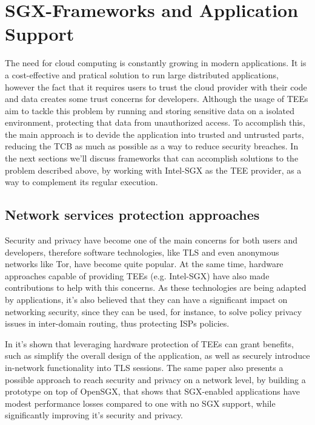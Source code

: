 \section{SGX-Frameworks and Application Support} %
\label{sec:sgx_frameworks}


The need for cloud computing is constantly growing in modern applications. It is a cost-effective and pratical solution to run large distributed applications, however the fact that it requires users to trust the cloud provider with their code and data creates some trust concerns for developers.
Although the usage of TEEs aim to tackle this problem by running and storing sensitive data on a isolated environment, protecting that data from unauthorized access. To accomplish this, the main approach is to devide the application into trusted and untrusted parts, reducing the TCB as much as possible as a way to reduce security breaches. 
In the next sections we'll discuss frameworks that can accomplish solutions to the problem described above, by working with Intel-SGX as the TEE provider, as a way to complement its regular execution.



\subsection{Network services protection approaches}
\label{ssec:sgx_network_frameworks}

Security and privacy have become one of the main concerns for both users and developers, therefore software technologies, like TLS and even anonymous networks like Tor, have become quite popular. At the same time, hardware approaches capable of providing TEEs (e.g. Intel-SGX) have also made contributions to help with this concerns. 
As these technologies are being adapted by applications, it's also believed that they can have a significant impact on networking security, since they can be used, for instance, to solve policy privacy issues in inter-domain routing, thus protecting ISPs policies. 

In \cite{torSGXPaper} it's shown that leveraging hardware protection of TEEs can grant benefits, such as simplify the overall design of the application, as well as securely introduce in-network functionality into TLS sessions. 
The same paper also presents a possible approach to reach security and privacy on a network level, by building a prototype on top of OpenSGX, that shows that SGX-enabled applications have modest performance losses compared to one with no SGX support, while significantly improving it's security and privacy.

